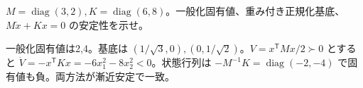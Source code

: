 \documentclass[11pt]{article}
\begin{document}
\problem[総合6：エネルギーと重み]
$M=\operatorname{diag}(3,2),K=\operatorname{diag}(6,8)$。一般化固有値、重み付き正規化基底、$M\dot x+Kx=0$ の安定性を示せ。
\begin{ans}
一般化固有値は2,4。基底は $(1/\sqrt3,0),(0,1/\sqrt2)$。$V=x^{\mathsf T}Mx/2\succ0$ とすると $\dot V=-x^{\mathsf T}Kx=-6x_1^2-8x_2^2<0$。状態行列は $-M^{-1}K=\operatorname{diag}(-2,-4)$ で固有値も負。両方法が漸近安定で一致。
\end{ans}
\end{document}
